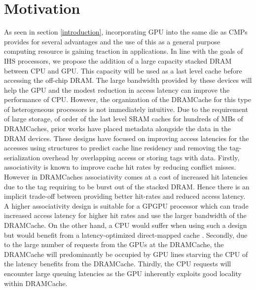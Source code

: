 \section{Motivation} \label{motivation}
As seen in section \ref{introduction}, incorporating GPU into the same die as CMPs provides for several advantages and the use of this as a general purpose computing resource is gaining traction in applications. In line with the goals of IHS processors, we propose the addition of a large capacity stacked DRAM between CPU and GPU. This capacity will be used as a last level cache before accessing the off-chip DRAM. The large bandwidth provided by these devices will help the GPU and the modest reduction in access latency can improve the performance of CPU. However, the organization of the DRAMCache for this type of heterogeneous processors is not immediately intuitive.
Due to the requirement of large storage, of order of the last level SRAM caches for hundreds of MBs of DRAMCaches, prior works have placed metadata alongside the data in the DRAM devices. These designs have focused on improving access latencies for the accesses using structures to predict cache line residency and removing the tag-serialization overhead by overlapping access or storing tags with data.
Firstly, associativity is known to improve cache hit rates by reducing conflict misses. However in DRAMCaches associativity comes at a cost of increased hit latencies due to the tag requiring to be burst out of the stacked DRAM. Hence there is an implicit trade-off between providing better hit-rates and reduced access latency. A higher associativity design is suitable for a GPGPU processor which can trade increased access latency for higher hit rates and use the larger bandwidth of the DRAMCache. On the other hand, a CPU would suffer when using such a design but would benefit from a latency-optimized direct-mapped cache \cite{alloy-cache}. Secondly, due to the large number of requests from the GPUs at the DRAMCache, the DRAMCache will predominantly be occupied by GPU lines starving the CPU of the latency benefits from the DRAMCache. Thirdly, the CPU requests will encounter large queuing latencies as the GPU inherently exploits good locality within DRAMCache.



